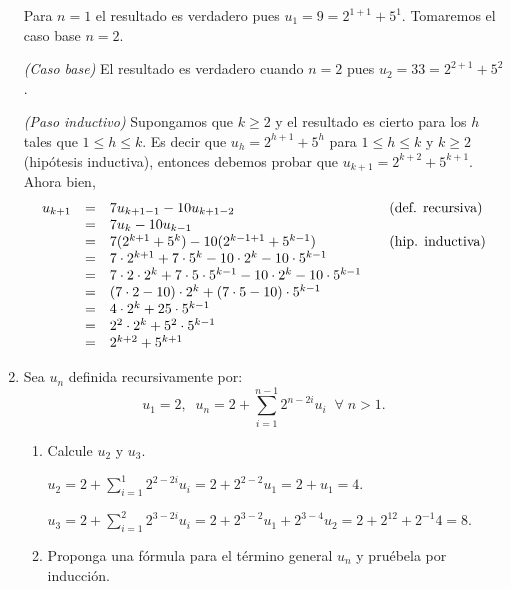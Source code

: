 \begin{enumerate}
    
    \rta Para $n=1$ el resultado es verdadero pues $u_1 = 9 = 2^{1+1} + 5^1$. Tomaremos el caso  base $n=2$.
    
    \textit{(Caso  base) }El resultado es verdadero cuando  $n=2$ pues $u_2 = 33 = 2^{2+1} + 5^2$.
    
    \textit{(Paso  inductivo) } Supongamos que $k \ge 2$ y el resultado  es cierto para los $h$ tales que  $1 \le h \le k$. Es decir que $u_h = 2^{h+1} + 5^h$ para $1 \le h \le k$ y $k \ge 2$ (hipótesis inductiva), entonces debemos probar que $u_{k+1} = 2^{k+2}+5^{k+1}$. Ahora bien, 
    \begin{equation*}
    \begin{matrix*}[l]
    u_{k+1} &=& 7u_{k+1-1} - 10u_{k+1-2}  \hfill &\quad \text{(def. recursiva)} \hfill \\
    &=& 7u_{k} - 10u_{k-1}  \hfill &\hfill\\
    &=& 7( 2^{k+1} + 5^k) -10 ( 2^{k-1+1} + 5^{k-1})  \hfill &\quad \text{(hip. inductiva})\hfill \\
    &=& 7 \cdot  2^{k+1} + 7 \cdot 5^k -10 \cdot  2^{k} -10 \cdot  5^{k-1} \hfill  & \hfill\\
    &=& 7 \cdot 2 \cdot  2^{k} + 7 \cdot 5 \cdot 5^{k-1} -10 \cdot  2^{k} -10 \cdot  5^{k-1}  \hfill  & \hfill\\
    &=& (7 \cdot 2 -10 ) \cdot  2^{k} + (7 \cdot 5 -10) \cdot 5^{k-1}  \hfill  & \hfill\\
    &=& 4 \cdot  2^{k} + 25 \cdot 5^{k-1}  \hfill  & \hfill\\
    &=& 2^2 \cdot  2^{k} + 5^2 \cdot 5^{k-1}  \hfill  & \hfill\\
    &=& 2^{k+2} + 5^{k+1}  \hfill  & \hfill
    \end{matrix*}
    \end{equation*}
    
    
    \item Sea $u_n$ definida recursivamente por: 
    $$u_1=2,\;\; u_n=2+\sum_{i=1}^{n-1}2^{n-2i}u_i \;\;\forall\; n >1.$$
    \begin{enumerate}
        \item Calcule $u_2$ y $u_3$.
        
        \rta $u_2 = 2+\sum_{i=1}^{1}2^{2-2i}u_i = 2+2^{2-2}u_1 = 2 + u_1 = 4$.
        
        $u_3 = 2+\sum_{i=1}^{2}2^{3-2i}u_i = 2+2^{3-2}u_1 + 2^{3-4}u_2=2+2^12 + 2^{-1}4 = 8$.
        
        \item Proponga una fórmula para el término general $u_n$ y pruébela por inducción.
        

\end{enumerate}
\end{enumerate}
